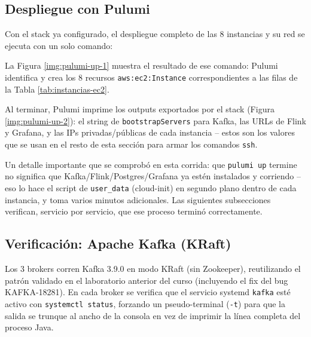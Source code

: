 \subsection{Despliegue con Pulumi}

Con el stack ya configurado, el despliegue completo de las 8 instancias y su red se ejecuta con un solo comando:


La Figura \ref{img:pulumi-up-1} muestra el resultado de ese comando: Pulumi identifica y crea los 8 recursos \texttt{aws:ec2:Instance} correspondientes a las filas de la Tabla \ref{tab:instancias-ec2}.


Al terminar, Pulumi imprime los outputs exportados por el stack (Figura \ref{img:pulumi-up-2}): el string de \texttt{bootstrapServers} para Kafka, las URLs de Flink y Grafana, y las IPs privadas/públicas de cada instancia -- estos son los valores que se usan en el resto de esta sección para armar los comandos \texttt{ssh}.


Un detalle importante que se comprobó en esta corrida: que \texttt{pulumi up} termine no significa que Kafka/Flink/Postgres/Grafana ya estén instalados y corriendo -- eso lo hace el script de \texttt{user\_data} (cloud-init) en segundo plano dentro de cada instancia, y toma varios minutos adicionales. Las siguientes subsecciones verifican, servicio por servicio, que ese proceso terminó correctamente.

\subsection{Verificación: Apache Kafka (KRaft)}

Los 3 brokers corren Kafka 3.9.0 en modo KRaft (sin Zookeeper), reutilizando el patrón validado en el laboratorio anterior del curso (incluyendo el fix del bug KAFKA-18281). En cada broker se verifica que el servicio systemd \texttt{kafka} esté activo con \texttt{systemctl status}, forzando un pseudo-terminal (\texttt{-t}) para que la salida se trunque al ancho de la consola en vez de imprimir la línea completa del proceso Java.

